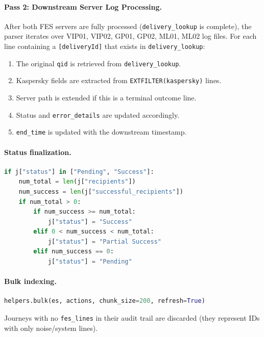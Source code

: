 \documentclass[12pt,a4paper,oneside]{report}
\begin{document}
\paragraph{Pass 2: Downstream Server Log Processing.}
After both FES servers are fully processed (\texttt{delivery\_lookup} is complete), the parser iterates over VIP01, VIP02, GP01, GP02, ML01, ML02 log files.
For each line containing a \texttt{[deliveryId]} that exists in \texttt{delivery\_lookup}:
\begin{enumerate}
  \item The original \texttt{qid} is retrieved from \texttt{delivery\_lookup}.
  \item Kaspersky fields are extracted from \texttt{EXTFILTER(kaspersky)} lines.
  \item Server path is extended if this is a terminal outcome line.
  \item Status and \texttt{error\_details} are updated accordingly.
  \item \texttt{end\_time} is updated with the downstream timestamp.
\end{enumerate}

\paragraph{Status finalization.}

\begin{lstlisting}[style=reportcode,language=Python,caption={Recipient-based status resolution},label={lst:status}]
if j["status"] in ["Pending", "Success"]:
    num_total = len(j["recipients"])
    num_success = len(j["successful_recipients"])
    if num_total > 0:
        if num_success >= num_total:
            j["status"] = "Success"
        elif 0 < num_success < num_total:
            j["status"] = "Partial Success"
        elif num_success == 0:
            j["status"] = "Pending"
\end{lstlisting}

\paragraph{Bulk indexing.}

\begin{lstlisting}[style=reportcode,language=Python,caption={Bulk indexing with immediate refresh},label={lst:bulk}]
helpers.bulk(es, actions, chunk_size=200, refresh=True)
\end{lstlisting}

Journeys with no \texttt{fes\_lines} in their audit trail are discarded (they represent IDs with only noise/system lines).
\end{document}
